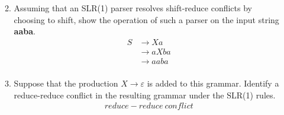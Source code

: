 \documentclass[10pt]{article}
\begin{document}
\begin{enumerate}
\begin{enumerate}
\[\begin{array}{cll}
\begin{tabular}{|c|*{6}{c}|}
                        
                        \hline
                  \end{tabular}
            \end{array}\]
\item Assuming that an SLR(1) parser resolves shift-reduce conflicts
by choosing to shift, show the operation of such a parser on the input
string \textbf{aaba}.
          \[\begin{array}{cll}
                    S & \rightarrow Xa \\
                      & \rightarrow aXba \\
                      & \rightarrow aaba \\
            \end{array}\] 
\item Suppose that the production $X \rightarrow \varepsilon$ is added
to this grammar.  Identify a reduce-reduce conflict in the resulting
grammar under the SLR(1) rules.
           \[\begin{array}{cll}
                 reduce-reduce \  conflict
            \end{array}\]
\end{enumerate}
\end{enumerate}
\end{document}
